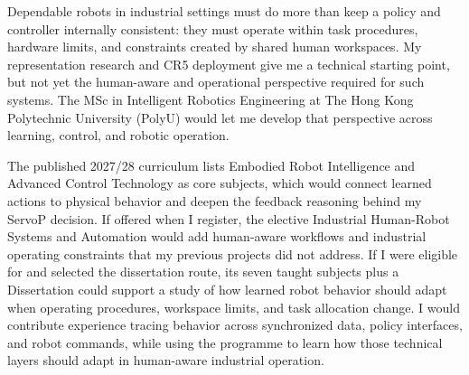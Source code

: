 Dependable robots in industrial settings must do more than keep a policy and controller internally consistent: they must operate within task procedures, hardware limits, and constraints created by shared human workspaces. My representation research and CR5 deployment give me a technical starting point, but not yet the human-aware and operational perspective required for such systems. The MSc in Intelligent Robotics Engineering at The Hong Kong Polytechnic University (PolyU) would let me develop that perspective across learning, control, and robotic operation.

The published 2027/28 curriculum lists Embodied Robot Intelligence and Advanced Control Technology as core subjects, which would connect learned actions to physical behavior and deepen the feedback reasoning behind my ServoP decision. If offered when I register, the elective Industrial Human-Robot Systems and Automation would add human-aware workflows and industrial operating constraints that my previous projects did not address. If I were eligible for and selected the dissertation route, its seven taught subjects plus a Dissertation could support a study of how learned robot behavior should adapt when operating procedures, workspace limits, and task allocation change. I would contribute experience tracing behavior across synchronized data, policy interfaces, and robot commands, while using the programme to learn how those technical layers should adapt in human-aware industrial operation.
